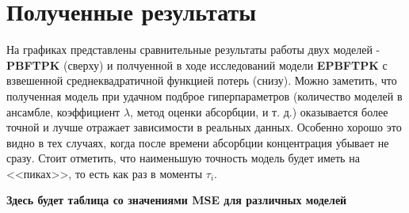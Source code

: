\documentclass[12pt]{article}
\begin{document}
\newpage

\section{Полученные результаты}

На графиках представлены сравнительные результаты работы двух моделей - \textbf{PBFTPK} (сверху) и полчуенной в ходе исследований модели \textbf{EPBFTPK} с взвешенной среднеквадратичной функцией потерь (снизу). Можно заметить, что полученная модель при удачном подброе гиперпараметров (количество моделей в ансамбле, коэффициент $\lambda$, метод оценки абсорбции, и т. д.) оказывается более точной и лучше отражает зависимости в реальных данных. Особенно хорошо это видно в тех случаях, когда после времени абсорбции концентрация убывает не сразу. Стоит отметить, что наименьшую точность модель будет иметь на <<пиках>>, то есть как раз в моменты $\tau_i$.


\begin{center}
	\textbf{Здесь будет таблица со значениями MSE для различных моделей}
\end{center}

\newpage
\end{document}
